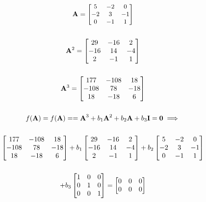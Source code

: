 \documentclass[openany]{book}
\begin{document}
\begin{gather*}
\small
\mathbf{A} = 
\begin{bmatrix} 
    5 & -2 & 0 \\ 
    -2 & 3 & -1 \\
    0 & -1 & 1    
\end{bmatrix}
\\ \\
\mathbf{A}^2 = 
\begin{bmatrix} 
    29 & -16 & 2 \\ 
    -16 & 14 & -4 \\
    2 & -1 & 1    
\end{bmatrix}
\\ \\
\mathbf{A}^3 = 
\begin{bmatrix} 
    177 & -108 & 18 \\ 
    -108 & 78 & -18 \\
    18 & -18 & 6    
\end{bmatrix} \\ \\
f(\textbf{A}) = f(\textbf{A}) = 
   = \textbf{A}^3 + b_1 \textbf{A}^{2} +  b_{2} \textbf{A} + b_3 \textbf{I} 
   = \textbf{0} \implies \\ \\
\begin{bmatrix} 
    177 & -108 & 18 \\ 
    -108 & 78 & -18 \\
    18 & -18 & 6    
\end{bmatrix}
+ b_1
\begin{bmatrix} 
    29 & -16 & 2 \\ 
    -16 & 14 & -4 \\
    2 & -1 & 1    
\end{bmatrix}
+ b_2
\begin{bmatrix} 
    5 & -2 & 0 \\ 
    -2 & 3 & -1 \\
    0 & -1 & 1    
\end{bmatrix}  \\ \\
+ b_3
\begin{bmatrix} 
    1 & 0 & 0 \\ 
    0 & 1 & 0 \\
    0 & 0 & 1    
\end{bmatrix} =
\begin{bmatrix} 
    0 & 0 & 0 \\ 
    0 & 0 & 0 \\

\end{bmatrix}
\end{gather*}
\end{document}
